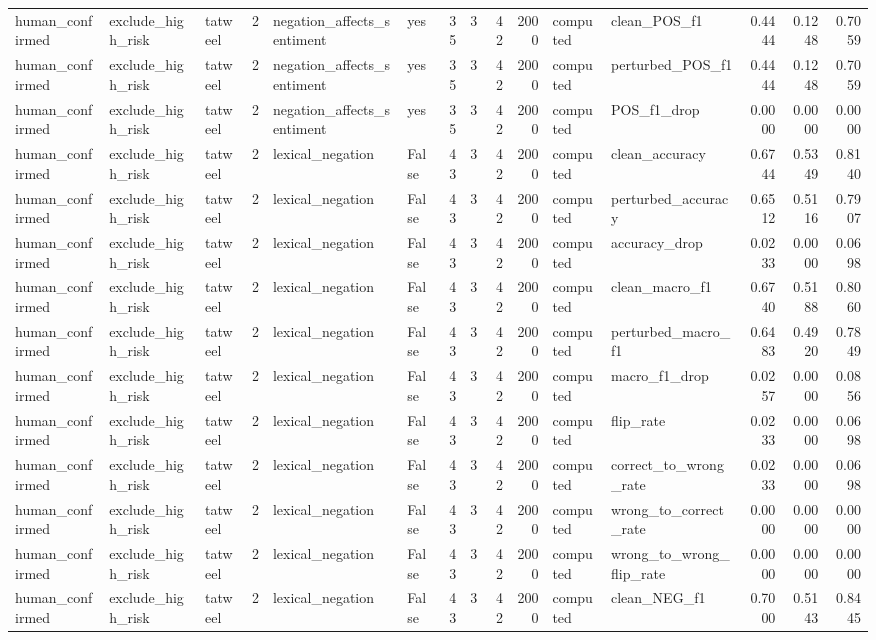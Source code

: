 \begin{tabular}{lllrllrrrrllrrr}
human_confirmed & exclude_high_risk & tatweel & 2 & negation_affects_sentiment & yes & 35 & 3 & 42 & 2000 & computed & clean_POS_f1 & 0.4444 & 0.1248 & 0.7059 \\
human_confirmed & exclude_high_risk & tatweel & 2 & negation_affects_sentiment & yes & 35 & 3 & 42 & 2000 & computed & perturbed_POS_f1 & 0.4444 & 0.1248 & 0.7059 \\
human_confirmed & exclude_high_risk & tatweel & 2 & negation_affects_sentiment & yes & 35 & 3 & 42 & 2000 & computed & POS_f1_drop & 0.0000 & 0.0000 & 0.0000 \\
human_confirmed & exclude_high_risk & tatweel & 2 & lexical_negation & False & 43 & 3 & 42 & 2000 & computed & clean_accuracy & 0.6744 & 0.5349 & 0.8140 \\
human_confirmed & exclude_high_risk & tatweel & 2 & lexical_negation & False & 43 & 3 & 42 & 2000 & computed & perturbed_accuracy & 0.6512 & 0.5116 & 0.7907 \\
human_confirmed & exclude_high_risk & tatweel & 2 & lexical_negation & False & 43 & 3 & 42 & 2000 & computed & accuracy_drop & 0.0233 & 0.0000 & 0.0698 \\
human_confirmed & exclude_high_risk & tatweel & 2 & lexical_negation & False & 43 & 3 & 42 & 2000 & computed & clean_macro_f1 & 0.6740 & 0.5188 & 0.8060 \\
human_confirmed & exclude_high_risk & tatweel & 2 & lexical_negation & False & 43 & 3 & 42 & 2000 & computed & perturbed_macro_f1 & 0.6483 & 0.4920 & 0.7849 \\
human_confirmed & exclude_high_risk & tatweel & 2 & lexical_negation & False & 43 & 3 & 42 & 2000 & computed & macro_f1_drop & 0.0257 & 0.0000 & 0.0856 \\
human_confirmed & exclude_high_risk & tatweel & 2 & lexical_negation & False & 43 & 3 & 42 & 2000 & computed & flip_rate & 0.0233 & 0.0000 & 0.0698 \\
human_confirmed & exclude_high_risk & tatweel & 2 & lexical_negation & False & 43 & 3 & 42 & 2000 & computed & correct_to_wrong_rate & 0.0233 & 0.0000 & 0.0698 \\
human_confirmed & exclude_high_risk & tatweel & 2 & lexical_negation & False & 43 & 3 & 42 & 2000 & computed & wrong_to_correct_rate & 0.0000 & 0.0000 & 0.0000 \\
human_confirmed & exclude_high_risk & tatweel & 2 & lexical_negation & False & 43 & 3 & 42 & 2000 & computed & wrong_to_wrong_flip_rate & 0.0000 & 0.0000 & 0.0000 \\
human_confirmed & exclude_high_risk & tatweel & 2 & lexical_negation & False & 43 & 3 & 42 & 2000 & computed & clean_NEG_f1 & 0.7000 & 0.5143 & 0.8445 \\

\end{tabular}
